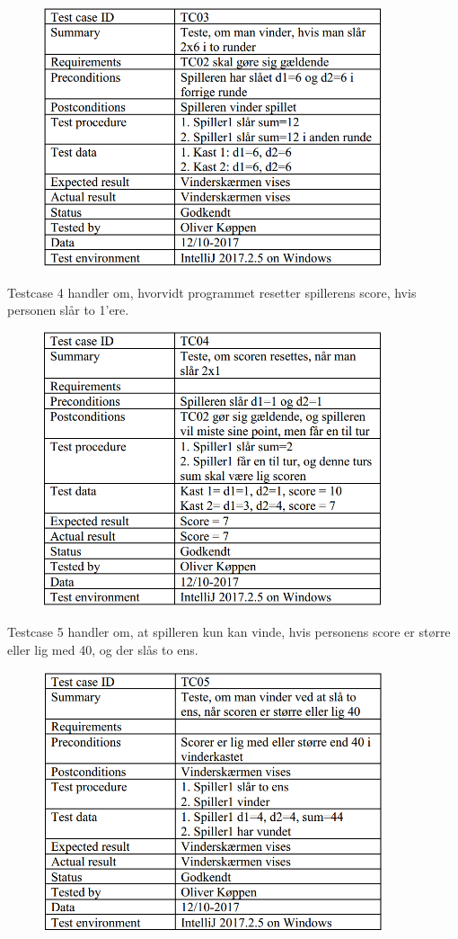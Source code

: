 \begin{figure}[h]
    \begin{center}
        \includegraphics[width=10cm]{graphics/TC03}
    \end{center}
\end{figure}

Testcase 4 handler om, hvorvidt programmet resetter spillerens score, hvis personen slår to 1'ere.

\begin{figure}[h]
    \begin{center}
        \includegraphics[width=10cm]{graphics/TC04}
    \end{center}
\end{figure}
\pagebreak

Testcase 5 handler om, at spilleren kun kan vinde, hvis personens score er større eller lig med 40, og der slås to ens.
\begin{figure}[h]
    \begin{center}
        \includegraphics[width=10cm]{graphics/TC05}
    \end{center}
\end{figure}